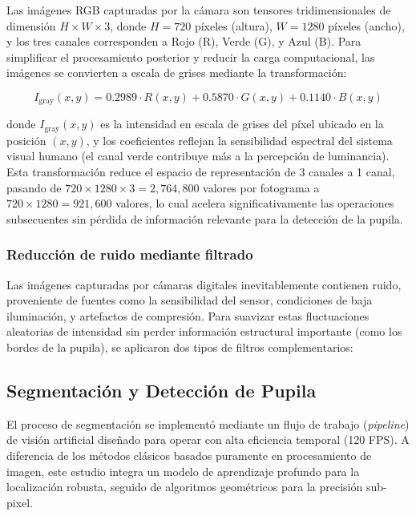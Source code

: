 Las imágenes RGB capturadas por la cámara son tensores tridimensionales de dimensión $H \times W \times 3$, donde $H = 720$ píxeles (altura), $W = 1280$ píxeles (ancho), y los tres canales corresponden a Rojo (R), Verde (G), y Azul (B).
Para simplificar el procesamiento posterior y reducir la carga computacional, las imágenes se convierten a escala de grises mediante la transformación:

\begin{equation}
	I_{\text{gray}}(x, y) = 0.2989 \cdot R(x, y) + 0.5870 \cdot G(x, y) + 0.1140 \cdot B(x, y)
\end{equation}

donde $I_{\text{gray}}(x, y)$ es la intensidad en escala de grises del píxel ubicado en la posición $(x, y)$, y los coeficientes reflejan la sensibilidad espectral del sistema visual humano (el canal verde contribuye más a la percepción de luminancia).
Esta transformación reduce el espacio de representación de 3 canales a 1 canal, pasando de $720 \times 1280 \times 3 = 2{,}764{,}800$ valores por fotograma a $720 \times 1280 = 921{,}600$ valores, lo cual acelera significativamente las operaciones subsecuentes sin pérdida de información relevante para la detección de la pupila.

\subsubsection{Reducción de ruido mediante filtrado}

Las imágenes capturadas por cámaras digitales inevitablemente contienen ruido, proveniente de fuentes como la sensibilidad del sensor, condiciones de baja iluminación, y artefactos de compresión.
Para suavizar estas fluctuaciones aleatorias de intensidad sin perder información estructural importante (como los bordes de la pupila), se aplicaron dos tipos de filtros complementarios:


\subsection{Segmentación y Detección de Pupila}
\label{sec:segmentacion}

El proceso de segmentación se implementó mediante un flujo de trabajo (\textit{pipeline}) de visión artificial diseñado para operar con alta eficiencia temporal (120 FPS).
A diferencia de los métodos clásicos basados puramente en procesamiento de imagen, este estudio integra un modelo de aprendizaje profundo para la localización robusta, seguido de algoritmos geométricos para la precisión sub-pixel.

